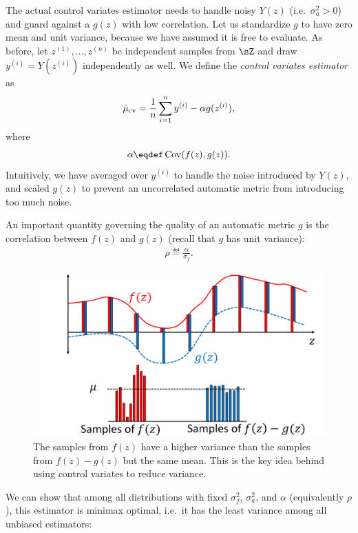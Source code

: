 The actual control variates estimator needs to
handle noisy $Y(z)$ (i.e.\ $\sigma^2_a > 0$) and
guard against a $g(z)$ with low correlation.
Let us standardize $g$ to have zero mean and unit variance, because we have
assumed it is free to evaluate.
As before, let $z^{(1)}, \dots, z^{(n)}$ be independent samples from $\sZ$ and
draw $y^{(i)} = Y(z^{(i)})$ independently as well.
We define the \emph{control variates estimator} as
\begin{align}
\hat \mu_\text{cv} = \frac{1}{n} \sum_{i=1}^n y^{(i)} - \alpha g(z^{(i)}),
\end{align}
where
\begin{align}
  \alpha \eqdef \Cov(f(z),g(z)).
\end{align}
Intuitively, we have averaged over $y^{(i)}$ to handle the noise introduced by $Y(z)$, and scaled $g(z)$ to prevent an uncorrelated automatic metric from introducing too much noise.

An important quantity governing the quality of an automatic metric $g$
is the correlation between $f(z)$ and $g(z)$ (recall that $g$ has unit variance):
\begin{align}
\rho \eqdef \frac{\alpha}{\sigma_f}.  %
\end{align}

\begin{figure}
\centering
  \includegraphics[width=0.8\columnwidth]{figures/variance_reduction_extreme}
  \caption[Intuition for control variates]{\label{fig:variance_reduction}
  The samples from $f(z)$ have a higher variance than the samples
  from $f(z)-g(z)$ but the same mean. This is the key idea behind using control variates to reduce variance.}
\end{figure}

We can show that among all distributions with
fixed $\sigma^2_f$, $\sigma^2_a$, and $\alpha$ (equivalently $\rho$), this estimator is minimax optimal, i.e.\ it has the least variance among all unbiased estimators:

